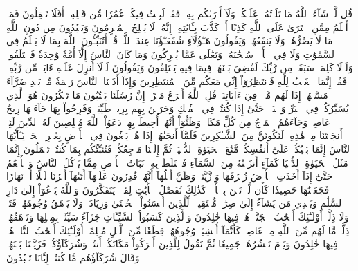 قُل لَّوۡ شَآءَ ٱللَّهُ مَا تَلَوۡتُهُۥ عَلَيۡكُمۡ وَلَآ أَدۡرَىٰكُم بِهِۦۖ فَقَدۡ لَبِثۡتُ فِيكُمۡ عُمُرٗا مِّن قَبۡلِهِۦٓۚ أَفَلَا تَعۡقِلُونَ
فَمَنۡ أَظۡلَمُ مِمَّنِ ٱفۡتَرَىٰ عَلَى ٱللَّهِ كَذِبًا أَوۡ كَذَّبَ بِـَٔايَٰتِهِۦٓۚ إِنَّهُۥ لَا يُفۡلِحُ ٱلۡمُجۡرِمُونَ
وَيَعۡبُدُونَ مِن دُونِ ٱللَّهِ مَا لَا يَضُرُّهُمۡ وَلَا يَنفَعُهُمۡ وَيَقُولُونَ هَـٰٓؤُلَآءِ شُفَعَـٰٓؤُنَا عِندَ ٱللَّهِۚ قُلۡ أَتُنَبِّـُٔونَ ٱللَّهَ بِمَا لَا يَعۡلَمُ فِي ٱلسَّمَٰوَٰتِ وَلَا فِي ٱلۡأَرۡضِۚ سُبۡحَٰنَهُۥ وَتَعَٰلَىٰ عَمَّا يُشۡرِكُونَ
وَمَا كَانَ ٱلنَّاسُ إِلَّآ أُمَّةٗ وَٰحِدَةٗ فَٱخۡتَلَفُواْۚ وَلَوۡلَا كَلِمَةٞ سَبَقَتۡ مِن رَّبِّكَ لَقُضِيَ بَيۡنَهُمۡ فِيمَا فِيهِ يَخۡتَلِفُونَ
وَيَقُولُونَ لَوۡلَآ أُنزِلَ عَلَيۡهِ ءَايَةٞ مِّن رَّبِّهِۦۖ فَقُلۡ إِنَّمَا ٱلۡغَيۡبُ لِلَّهِ فَٱنتَظِرُوٓاْ إِنِّي مَعَكُم مِّنَ ٱلۡمُنتَظِرِينَ
وَإِذَآ أَذَقۡنَا ٱلنَّاسَ رَحۡمَةٗ مِّنۢ بَعۡدِ ضَرَّآءَ مَسَّتۡهُمۡ إِذَا لَهُم مَّكۡرٞ فِيٓ ءَايَاتِنَاۚ قُلِ ٱللَّهُ أَسۡرَعُ مَكۡرًاۚ إِنَّ رُسُلَنَا يَكۡتُبُونَ مَا تَمۡكُرُونَ
هُوَ ٱلَّذِي يُسَيِّرُكُمۡ فِي ٱلۡبَرِّ وَٱلۡبَحۡرِۖ حَتَّىٰٓ إِذَا كُنتُمۡ فِي ٱلۡفُلۡكِ وَجَرَيۡنَ بِهِم بِرِيحٖ طَيِّبَةٖ وَفَرِحُواْ بِهَا جَآءَتۡهَا رِيحٌ عَاصِفٞ وَجَآءَهُمُ ٱلۡمَوۡجُ مِن كُلِّ مَكَانٖ وَظَنُّوٓاْ أَنَّهُمۡ أُحِيطَ بِهِمۡ دَعَوُاْ ٱللَّهَ مُخۡلِصِينَ لَهُ ٱلدِّينَ لَئِنۡ أَنجَيۡتَنَا مِنۡ هَٰذِهِۦ لَنَكُونَنَّ مِنَ ٱلشَّـٰكِرِينَ
فَلَمَّآ أَنجَىٰهُمۡ إِذَا هُمۡ يَبۡغُونَ فِي ٱلۡأَرۡضِ بِغَيۡرِ ٱلۡحَقِّۗ يَـٰٓأَيُّهَا ٱلنَّاسُ إِنَّمَا بَغۡيُكُمۡ عَلَىٰٓ أَنفُسِكُمۖ مَّتَٰعَ ٱلۡحَيَوٰةِ ٱلدُّنۡيَاۖ ثُمَّ إِلَيۡنَا مَرۡجِعُكُمۡ فَنُنَبِّئُكُم بِمَا كُنتُمۡ تَعۡمَلُونَ
إِنَّمَا مَثَلُ ٱلۡحَيَوٰةِ ٱلدُّنۡيَا كَمَآءٍ أَنزَلۡنَٰهُ مِنَ ٱلسَّمَآءِ فَٱخۡتَلَطَ بِهِۦ نَبَاتُ ٱلۡأَرۡضِ مِمَّا يَأۡكُلُ ٱلنَّاسُ وَٱلۡأَنۡعَٰمُ حَتَّىٰٓ إِذَآ أَخَذَتِ ٱلۡأَرۡضُ زُخۡرُفَهَا وَٱزَّيَّنَتۡ وَظَنَّ أَهۡلُهَآ أَنَّهُمۡ قَٰدِرُونَ عَلَيۡهَآ أَتَىٰهَآ أَمۡرُنَا لَيۡلًا أَوۡ نَهَارٗا فَجَعَلۡنَٰهَا حَصِيدٗا كَأَن لَّمۡ تَغۡنَ بِٱلۡأَمۡسِۚ كَذَٰلِكَ نُفَصِّلُ ٱلۡأٓيَٰتِ لِقَوۡمٖ يَتَفَكَّرُونَ
وَٱللَّهُ يَدۡعُوٓاْ إِلَىٰ دَارِ ٱلسَّلَٰمِ وَيَهۡدِي مَن يَشَآءُ إِلَىٰ صِرَٰطٖ مُّسۡتَقِيمٖ
۞لِّلَّذِينَ أَحۡسَنُواْ ٱلۡحُسۡنَىٰ وَزِيَادَةٞۖ وَلَا يَرۡهَقُ وُجُوهَهُمۡ قَتَرٞ وَلَا ذِلَّةٌۚ أُوْلَـٰٓئِكَ أَصۡحَٰبُ ٱلۡجَنَّةِۖ هُمۡ فِيهَا خَٰلِدُونَ
وَٱلَّذِينَ كَسَبُواْ ٱلسَّيِّـَٔاتِ جَزَآءُ سَيِّئَةِۭ بِمِثۡلِهَا وَتَرۡهَقُهُمۡ ذِلَّةٞۖ مَّا لَهُم مِّنَ ٱللَّهِ مِنۡ عَاصِمٖۖ كَأَنَّمَآ أُغۡشِيَتۡ وُجُوهُهُمۡ قِطَعٗا مِّنَ ٱلَّيۡلِ مُظۡلِمًاۚ أُوْلَـٰٓئِكَ أَصۡحَٰبُ ٱلنَّارِۖ هُمۡ فِيهَا خَٰلِدُونَ
وَيَوۡمَ نَحۡشُرُهُمۡ جَمِيعٗا ثُمَّ نَقُولُ لِلَّذِينَ أَشۡرَكُواْ مَكَانَكُمۡ أَنتُمۡ وَشُرَكَآؤُكُمۡۚ فَزَيَّلۡنَا بَيۡنَهُمۡۖ وَقَالَ شُرَكَآؤُهُم مَّا كُنتُمۡ إِيَّانَا تَعۡبُدُونَ
